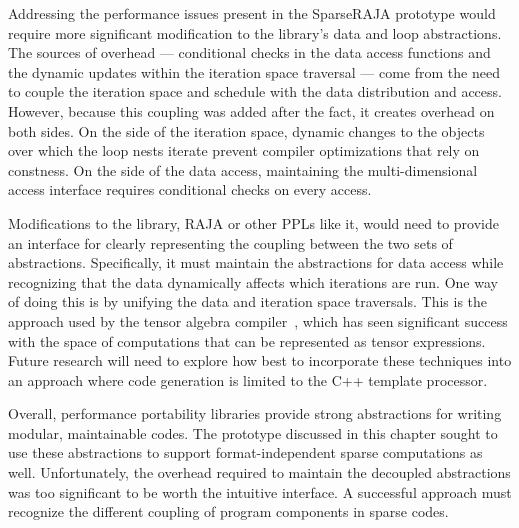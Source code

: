 Addressing the performance issues present in the SparseRAJA prototype would require more significant modification to the library's data and loop abstractions.
The sources of overhead --- conditional checks in the data access functions and the dynamic updates within the iteration space traversal --- come from the need to couple the iteration space and schedule with the data distribution and access.
However, because this coupling was added after the fact, it creates overhead on both sides.
On the side of the iteration space, dynamic changes to the objects over which the loop nests iterate prevent compiler optimizations that rely on constness.
On the side of the data access, maintaining the multi-dimensional access interface requires conditional checks on every access.

Modifications to the library, RAJA or other PPLs like it, would need to provide an interface for clearly representing the coupling between the two sets of abstractions.
Specifically, it must maintain the abstractions for data access while recognizing that the data dynamically affects which iterations are run.
One way of doing this is by unifying the data and iteration space traversals.
This is the approach used by the tensor algebra compiler~\cite{kjolstad2017tensor}, which has seen significant success with the space of computations that can be represented as tensor expressions.
Future research will need to explore how best to incorporate these techniques into an approach where code generation is limited to the C++ template processor.

Overall, performance portability libraries provide strong abstractions for writing modular, maintainable codes.
The prototype discussed in this chapter sought to use these abstractions to support format-independent sparse computations as well.
Unfortunately, the overhead required to maintain the decoupled abstractions was too significant to be worth the intuitive interface.
A successful approach must recognize the different coupling of program components in sparse codes. 